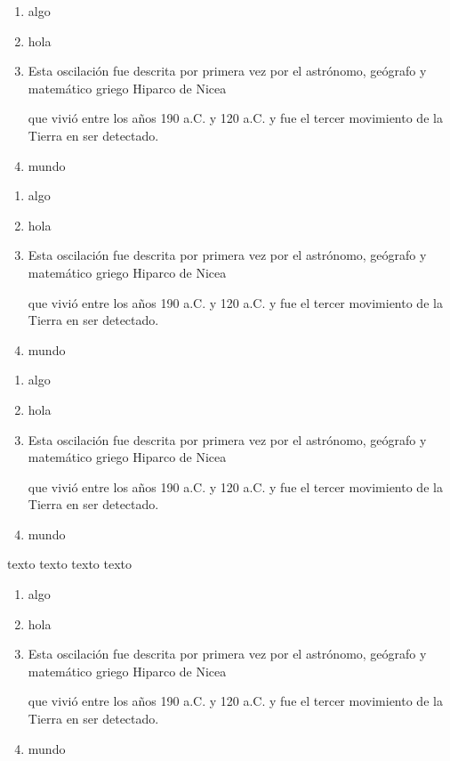 \documentclass{report}
\theoremstyle{definition}
\theoremstyle{remark}
\begin{document}
\begin{enumerate}[label=(\alph*)]
	\item algo 
	\item hola
	\item Esta oscilación fue descrita por primera vez por el astrónomo, geógrafo y matemático griego Hiparco de Nicea 
	
	que vivió entre los años 190 a.C. y 120 a.C. y fue el tercer movimiento de la Tierra en ser detectado.
	
	\item mundo
	
\end{enumerate}


\begin{enumerate}[label=\arabic*.-]
	\item algo 
	\item hola
	\item Esta oscilación fue descrita por primera vez por el astrónomo, geógrafo y matemático griego Hiparco de Nicea 
	
	que vivió entre los años 190 a.C. y 120 a.C. y fue el tercer movimiento de la Tierra en ser detectado.
	
	\item mundo
	
\end{enumerate}

\begin{enumerate}[start=1001,label=\Roman*)]
	\item algo 
	\item hola
	\item Esta oscilación fue descrita por primera vez por el astrónomo, geógrafo y matemático griego Hiparco de Nicea 
	
	que vivió entre los años 190 a.C. y 120 a.C. y fue el tercer movimiento de la Tierra en ser detectado.
	
	\item mundo
	
\end{enumerate}

texto texto texto texto

\begin{enumerate}[resume*]
	\item algo 
	\item hola
	\item Esta oscilación fue descrita por primera vez por el astrónomo, geógrafo y matemático griego Hiparco de Nicea 
	
	que vivió entre los años 190 a.C. y 120 a.C. y fue el tercer movimiento de la Tierra en ser detectado.
	
	\item mundo
	
\end{enumerate}
\end{document}
